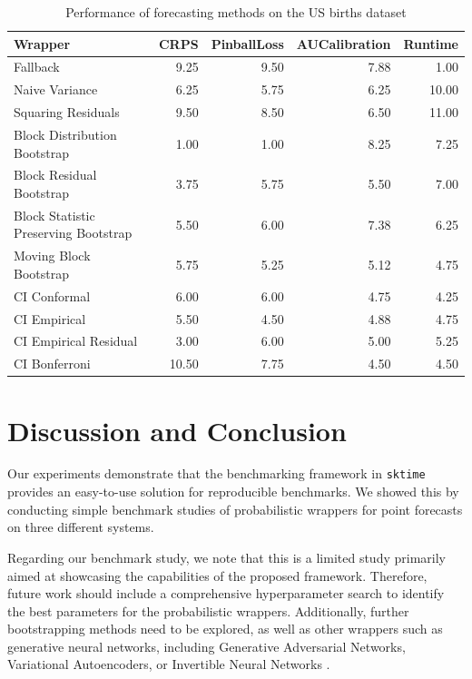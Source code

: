 \begin{table}[h]
    \centering
    \caption{Performance of forecasting methods on the US births dataset}
    \label{table:us_births_results}
\begin{tabular}{lrrrr}
\toprule
Wrapper & CRPS & PinballLoss & AUCalibration & Runtime \\
\midrule
Fallback & 9.25 & 9.50 & 7.88 & 1.00 \\
Naive Variance & 6.25 & 5.75 & 6.25 & 10.00 \\
Squaring Residuals & 9.50 & 8.50 & 6.50 & 11.00 \\
Block Distribution Bootstrap & 1.00 & 1.00 & 8.25 & 7.25 \\
Block Residual Bootstrap & 3.75 & 5.75 & 5.50 & 7.00 \\
Block Statistic Preserving Bootstrap & 5.50 & 6.00 & 7.38 & 6.25 \\
Moving Block Bootstrap & 5.75 & 5.25 & 5.12 & 4.75 \\
CI Conformal & 6.00 & 6.00 & 4.75 & 4.25 \\
CI Empirical & 5.50 & 4.50 & 4.88 & 4.75 \\
CI Empirical Residual & 3.00 & 6.00 & 5.00 & 5.25 \\
CI Bonferroni  & 10.50 & 7.75 & 4.50 & 4.50 \\
\bottomrule
\end{tabular}

\end{table}


\section{Discussion and Conclusion} \label{conclusion}
Our experiments demonstrate that the benchmarking framework in \texttt{sktime} provides an easy-to-use solution for reproducible benchmarks. We showed this by conducting simple benchmark studies of probabilistic wrappers for point forecasts on three different systems.

Regarding our benchmark study, we note that this is a limited study primarily aimed at showcasing the capabilities of the proposed framework. Therefore, future work should include a comprehensive hyperparameter search to identify the best parameters for the probabilistic wrappers. Additionally, further bootstrapping methods need to be explored, as well as other wrappers such as generative neural networks, including Generative Adversarial Networks, Variational Autoencoders, or Invertible Neural Networks \cite{phipps2024, wang2020}.

